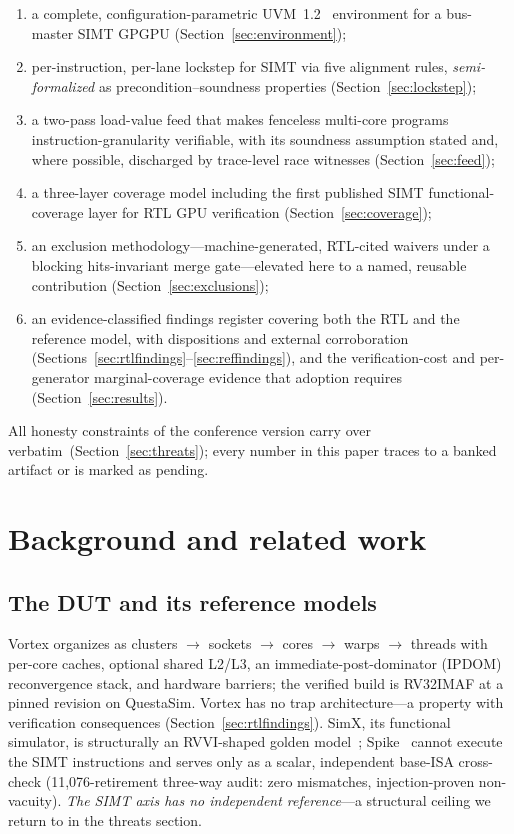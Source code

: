 \documentclass[review,12pt]{elsarticle}
\begin{document}
\begin{enumerate}
	\item a complete, configuration-parametric UVM~1.2~\cite{uvm}
	      environment for a bus-master SIMT GPGPU
	      (Section~\ref{sec:environment});
	\item per-instruction, per-lane lockstep for SIMT via five alignment
	      rules, \emph{semi-formalized} as precondition--soundness properties
	      (Section~\ref{sec:lockstep});
	\item a two-pass load-value feed that makes fenceless multi-core
	      programs instruction-granularity verifiable, with its soundness
	      assumption stated and, where possible, discharged by trace-level race
	      witnesses (Section~\ref{sec:feed});
	\item a three-layer coverage model including the first published SIMT
	      functional-coverage layer for RTL GPU verification
	      (Section~\ref{sec:coverage});
	\item an exclusion methodology---machine-generated, RTL-cited
	      waivers under a blocking hits-invariant merge gate---elevated here to
	      a named, reusable contribution (Section~\ref{sec:exclusions});
	\item an evidence-classified findings register covering both the RTL
	      and the reference model, with dispositions and external corroboration
	      (Sections~\ref{sec:rtlfindings}--\ref{sec:reffindings}), and the
	      verification-cost and per-generator marginal-coverage evidence that
	      adoption requires (Section~\ref{sec:results}).
\end{enumerate}

All honesty constraints of the conference version carry over
verbatim~(Section~\ref{sec:threats}); every number in this paper
traces to a banked artifact or is marked as pending.

\section{Background and related work}
\label{sec:related}

\subsection{The DUT and its reference models}
Vortex organizes as clusters $\to$ sockets $\to$ cores $\to$ warps
$\to$ threads with per-core caches, optional shared L2/L3, an
immediate-post-dominator (IPDOM) reconvergence stack, and hardware
barriers; the verified build is RV32IMAF at a pinned revision on
QuestaSim. Vortex has no trap architecture---a property with
verification consequences
(Section~\ref{sec:rtlfindings}). SimX, its functional simulator, is
structurally an RVVI-shaped golden model~\cite{rvvi}; Spike~\cite{spike}
cannot execute the SIMT instructions and serves only as a scalar,
independent base-ISA cross-check (11{,}076-retirement three-way audit:
zero mismatches, injection-proven non-vacuity). \emph{The SIMT axis
	has no independent reference}---a structural ceiling we return to in
the threats section.
\end{document}
